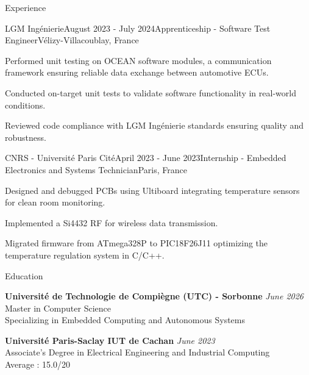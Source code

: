 \documentclass[
	10pt,
]{style} %
\begin{document}
\begin{rSection}{Experience}

	\begin{rSubsection}{LGM Ingénierie}{August 2023 - July 2024}{Apprenticeship - Software Test Engineer}{Vélizy-Villacoublay, France}
		\item Performed unit testing on OCEAN software modules, a communication framework ensuring reliable data exchange between automotive ECUs.
		\item Conducted on-target unit tests to validate software functionality in real-world conditions.
		\item Reviewed code compliance with LGM Ingénierie standards ensuring quality and robustness.
	\end{rSubsection}


	\begin{rSubsection}{CNRS - Université Paris Cité}{April 2023 - June 2023}{Internship - Embedded Electronics and Systems Technician}{Paris, France}
		\item Designed and debugged PCBs using Ultiboard integrating temperature sensors for clean room monitoring.
		\item Implemented a Si4432 RF for wireless data transmission.
		\item Migrated firmware from ATmega328P to PIC18F26J11 optimizing the temperature regulation system in C/C++.
	\end{rSubsection}

\end{rSection}


\begin{rSection}{Education}

	\textbf{Université de Technologie de Compiègne (UTC) - Sorbonne} \hfill \textit{June 2026} \\
	Master in Computer Science \\
	Specializing in Embedded Computing and Autonomous Systems

	\textbf{Université Paris-Saclay IUT de Cachan} \hfill \textit{June 2023} \\
	Associate's Degree in Electrical Engineering and Industrial Computing \\
	Average : 15.0/20

\end{rSection}
\end{document}
